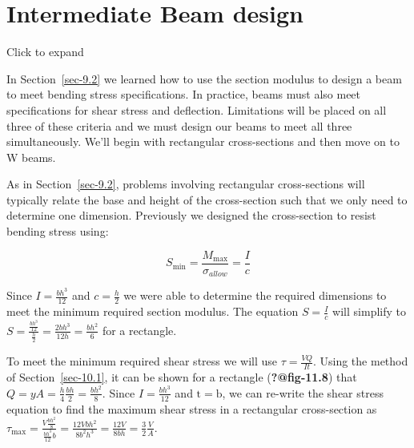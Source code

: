\documentclass[
  letterpaper,
  DIV=11,
  numbers=noendperiod]{scrreprt}
\theoremstyle{definition}
\theoremstyle{remark}
\begin{document}
\section{Intermediate Beam design}\label{sec-11.5}

Click to expand

In Section~\ref{sec-9.2} we learned how to use the section modulus to
design a beam to meet bending stress specifications. In practice, beams
must also meet specifications for shear stress and deflection.
Limitations will be placed on all three of these criteria and we must
design our beams to meet all three simultaneously. We'll begin with
rectangular cross-sections and then move on to W beams.

As in Section~\ref{sec-9.2}, problems involving rectangular
cross-sections will typically relate the base and height of the
cross-section such that we only need to determine one dimension.
Previously we designed the cross-section to resist bending stress using:

\[
S_{\min }=\frac{M_{\max }}{\sigma_{allow}}=\frac{I}{c}
\]

Since \(I=\frac{b h^{3}}{12}\) and \(c=\frac{h}{2}\) we were able to
determine the required dimensions to meet the minimum required section
modulus. The equation \(S=\frac{I}{c}\) will simplify to
\(S=\frac{\frac{b h^{3}}{12}}{\frac{h}{2}}=\frac{2 b h^{3}}{12 h}=\frac{b h^{2}}{6}\)
for a rectangle.

To meet the minimum required shear stress we will use
\(\tau=\frac{V Q}{I t}\). Using the method of Section~\ref{sec-10.1}, it
can be shown for a rectangle (\textbf{?@fig-11.8}) that
\(Q=y A=\frac{h}{4} \frac{b h}{2}=\frac{b h^{2}}{8}\). Since
\(I=\frac{b h^{3}}{12}\) and \(\mathrm{t}=\mathrm{b}\), we can re-write
the shear stress equation to find the maximum shear stress in a
rectangular cross-section as
\(\tau_{\max }=\frac{V \frac{b h^{2}}{8}}{\frac{b h^{3}}{12} b}=\frac{12 V b h^{2}}{8 b^{2} h^{3}}=\frac{12 V}{8 b h}=\frac{3}{2} \frac{V}{A}\).
\end{document}
